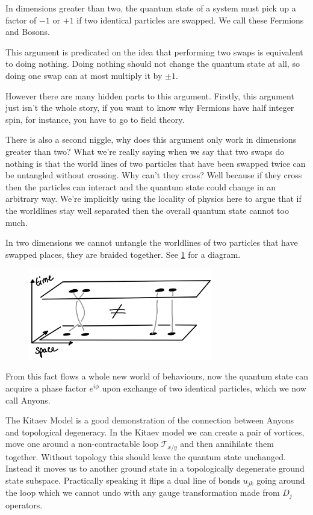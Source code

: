 In dimensions greater than two, the quantum state of a system must pick up a factor of \(-1\) or \(+1\) if two identical particles are swapped. We call these Fermions and Bosons.

This argument is predicated on the idea that performing two swaps is equivalent to doing nothing. Doing nothing should not change the quantum state at all, so doing one swap can at most multiply it by \(\pm 1\).

However there are many hidden parts to this argument. Firstly, this argument just isn't the whole story, if you want to know why Fermions have half integer spin, for instance, you have to go to field theory.

There is also a second niggle, why does this argument only work in dimensions greater than two? What we're really saying when we say that two swaps do nothing is that the world lines of two particles that have been swapped twice can be untangled without crossing. Why can't they cross? Well because if they cross then the particles can interact and the quantum state could change in an arbitrary way. We're implicitly using the locality of physics here to argue that if the worldlines stay well separated then the overall quantum state cannot too much.

In two dimensions we cannot untangle the worldlines of two particles that have swapped places, they are braided together. See \cref{fig:braiding} for a diagram.

\begin{figure}
\hypertarget{fig:braiding}{%
\centering
\includegraphics[width=0.71\textwidth,height=\textheight]{figure_code/amk_chapter/braiding.png}
\caption{}\label{fig:braiding}
}
\end{figure}

From this fact flows a whole new world of behaviours, now the quantum state can acquire a phase factor \(e^{i\phi}\) upon exchange of two identical particles, which we now call Anyons.

The Kitaev Model is a good demonstration of the connection between Anyons and topological degeneracy. In the Kitaev model we can create a pair of vortices, move one around a non-contractable loop \(\mathcal{T}_{x/y}\) and then annihilate them together. Without topology this should leave the quantum state unchanged. Instead it moves us to another ground state in a topologically degenerate ground state subspace. Practically speaking it flips a dual line of bonds \(u_{jk}\) going around the loop which we cannot undo with any gauge transformation made from \(D_j\) operators.


